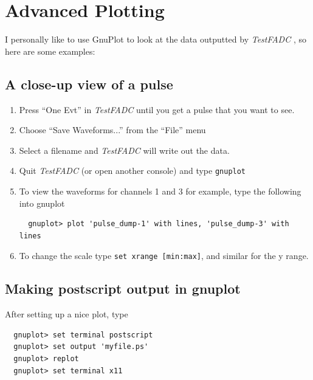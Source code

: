 \documentclass{article}
\newcommand{\F}[1]{\texttt{#1}}
\newcommand{\testfadc}{\emph{TestFADC} }
\begin{document}
\section{Advanced Plotting}

I personally like to use GnuPlot to look at the data outputted by
\testfadc, so here are some examples:

\subsection{A close-up view of a pulse}

\begin{enumerate}
\item Press ``One Evt'' in \testfadc until you get a pulse that you want to
see.
\item Choose ``Save Waveforms...'' from the ``File'' menu
\item Select a filename and \testfadc will write out the data.
\item Quit \testfadc (or open another console) and type \F{gnuplot}
\item To view the waveforms for channels 1 and 3 for example, type the following into gnuplot
\begin{verbatim}
  gnuplot> plot 'pulse_dump-1' with lines, 'pulse_dump-3' with lines
\end{verbatim}
\item To change the scale type \F{set xrange [min:max]}, and similar
  for the y range. 

\end{enumerate}

\subsection{Making postscript output in gnuplot}
After setting up a nice plot, type
\begin{verbatim}
  gnuplot> set terminal postscript
  gnuplot> set output 'myfile.ps'
  gnuplot> replot
  gnuplot> set terminal x11
\end{verbatim}
\end{document}
